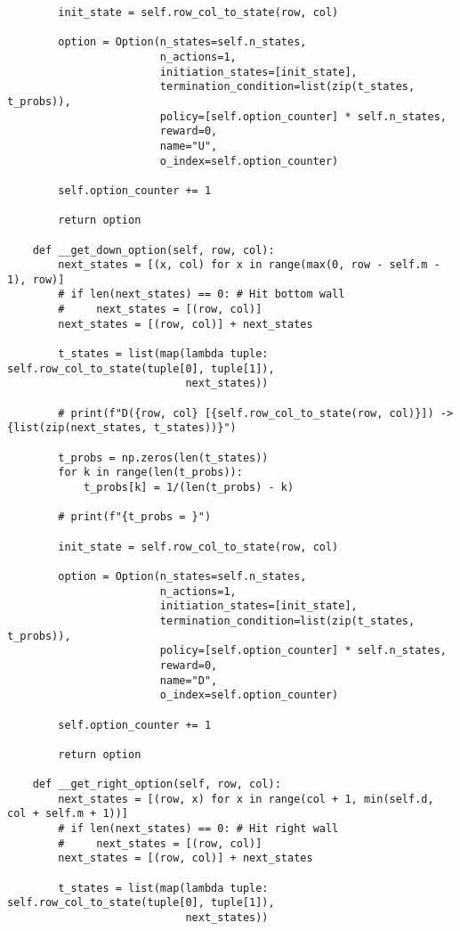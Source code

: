 \begin{verbatim}
        init_state = self.row_col_to_state(row, col)

        option = Option(n_states=self.n_states,
                        n_actions=1,
                        initiation_states=[init_state],
                        termination_condition=list(zip(t_states, t_probs)),
                        policy=[self.option_counter] * self.n_states,
                        reward=0,
                        name="U",
                        o_index=self.option_counter)

        self.option_counter += 1

        return option

    def __get_down_option(self, row, col):
        next_states = [(x, col) for x in range(max(0, row - self.m - 1), row)]
        # if len(next_states) == 0: # Hit bottom wall
        #     next_states = [(row, col)]
        next_states = [(row, col)] + next_states

        t_states = list(map(lambda tuple: self.row_col_to_state(tuple[0], tuple[1]),
                            next_states))

        # print(f"D({row, col} [{self.row_col_to_state(row, col)}]) -> {list(zip(next_states, t_states))}")

        t_probs = np.zeros(len(t_states))
        for k in range(len(t_probs)):
            t_probs[k] = 1/(len(t_probs) - k)

        # print(f"{t_probs = }")

        init_state = self.row_col_to_state(row, col)

        option = Option(n_states=self.n_states,
                        n_actions=1,
                        initiation_states=[init_state],
                        termination_condition=list(zip(t_states, t_probs)),
                        policy=[self.option_counter] * self.n_states,
                        reward=0,
                        name="D",
                        o_index=self.option_counter)

        self.option_counter += 1

        return option

    def __get_right_option(self, row, col):
        next_states = [(row, x) for x in range(col + 1, min(self.d, col + self.m + 1))]
        # if len(next_states) == 0: # Hit right wall
        #     next_states = [(row, col)]
        next_states = [(row, col)] + next_states

        t_states = list(map(lambda tuple: self.row_col_to_state(tuple[0], tuple[1]),
                            next_states))


\end{verbatim}
